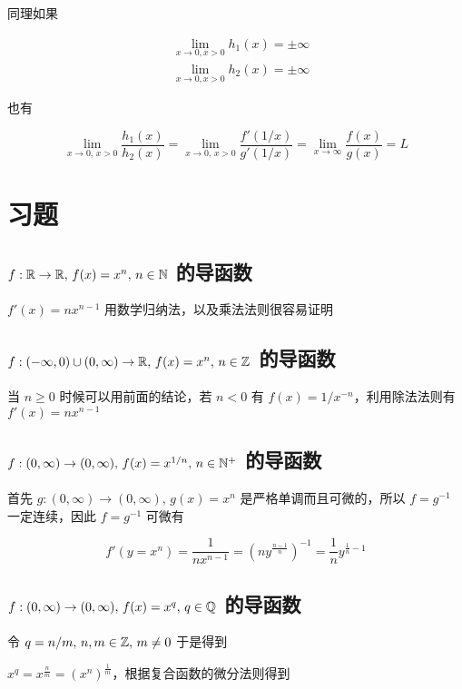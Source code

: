 同理如果

\begin{align*}
& \lim_{x \to 0, x >0} h_1(x) = \pm \infty  \\
& \lim_{x \to 0, x >0} h_2(x) = \pm \infty
\end{align*}

也有

\[
\lim_{x \to 0,\, x > 0}\frac{h_1(x)}{h_2(x)} = \lim_{x \to 0,\, x >0}\frac{f'(1/x)}{g'(1/x)}= \lim_{x \to \infty}\frac{f(x)}{g(x)} = L
\]

\section{习题}

\subsection{$f: \mathbb{R} \to \mathbb{R},\, f(x) = x^n,\, n \in \mathbb{N}$ 的导函数}

$f'(x) = nx^{n-1}$ 用数学归纳法，以及乘法法则很容易证明

\subsection{$f: (-\infty,0)\cup (0, \infty) \to \mathbb{R},\, f(x) = x^{n},\, n \in \mathbb{Z}$ 的导函数}

当 $n \ge 0$ 时候可以用前面的结论，若 $n < 0$ 有 $f(x) = 1/x^{-n}$，利用除法法则有 $f'(x) = nx^{n-1}$

\subsection{$f: (0, \infty) \to (0, \infty),\, f(x) = x^{1/n},\, n \in \mathbb{N}^+$ 的导函数}

首先 $g: (0, \infty) \to (0, \infty),\, g(x) = x^n$ 是严格单调而且可微的，所以 $f = g^{-1}$ 一定连续，因此 
$f = g^{-1}$ 可微有 

\[
f'(y = x^n) = \frac{1}{nx^{n-1}} = (ny^{\frac{n-1}{n}})^{-1} = \frac{1}{n}y^{\frac{1}{n} - 1}
\]

\subsection{$f: (0, \infty) \to (0, \infty),\, f(x) = x^{q},\, q \in \mathbb{Q}$ 的导函数}

令 $q = n/m ,\, n,m \in \mathbb{Z},\, m \ne 0$ 于是得到

$x^q = x^{\frac{n}{m}} = (x^n)^{\frac{1}{m}}$，根据复合函数的微分法则得到

